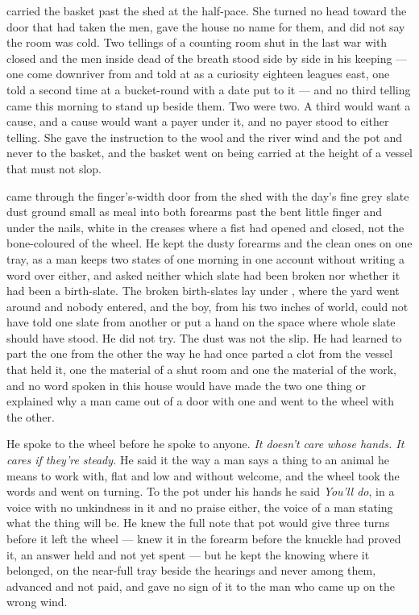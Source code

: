  carried the basket past the shed at the half-pace. She turned no head toward the door that had taken the men, gave the house no name for them, and did not say the room was cold. Two tellings of a counting room shut in the last war with  closed and the men inside dead of the breath stood side by side in his keeping — one come downriver from  and told at  as a curiosity eighteen leagues east, one told a second time at a bucket-round with a date put to it — and no third telling came this morning to stand up beside them. Two were two. A third would want a cause, and a cause would want a payer under it, and no payer stood to either telling. She gave the instruction to the wool and the river wind and the pot and never to the basket, and the basket went on being carried at the height of a vessel that must not slop.

 came through the finger's-width door from the shed with the day's fine grey slate dust ground small as meal into both forearms past the bent little finger and under the nails, white in the creases where a fist had opened and closed, not the bone-coloured  of the wheel. He kept the dusty forearms and the clean ones on one tray, as a man keeps two states of one morning in one account without writing a word over either, and asked neither which slate had been broken nor whether it had been a birth-slate. The broken birth-slates lay under , where the yard went around and nobody entered, and the boy, from his two inches of world, could not have told one slate from another or put a hand on the space where whole slate should have stood. He did not try. The dust was not the slip. He had learned to part the one from the other the way he had once parted a clot from the vessel that held it, one the material of a shut room and one the material of the work, and no word spoken in this house would have made the two one thing or explained why a man came out of a door with one and went to the wheel with the other.

He spoke to the wheel before he spoke to anyone. \emph{It doesn't care whose hands. It cares if they're steady.} He said it the way a man says a thing to an animal he means to work with, flat and low and without welcome, and the wheel took the words and went on turning. To the pot under his hands he said \emph{You'll do}, in a voice with no unkindness in it and no praise either, the voice of a man stating what the thing will be. He knew the full note that pot would give three turns before it left the wheel — knew it in the forearm before the knuckle had proved it, an answer held and not yet spent — but he kept the knowing where it belonged, on the near-full tray beside the hearings and never among them, advanced and not paid, and gave no sign of it to the man who came up on the wrong wind.

